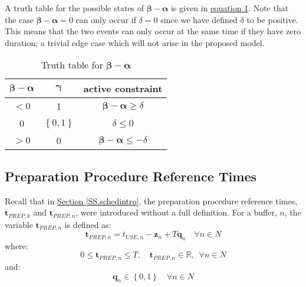 A truth table for the possible states of 
$\boldsymbol{\beta} - \boldsymbol{\alpha}$ is given in
\hyperref[tbl.truthalphabeta]{equation \ref*{tbl.truthalphabeta}}.
Note that the case $\boldsymbol{\beta} - \boldsymbol{\alpha} = 0$ can only
occur if $\delta = 0$ since we have defined $\delta$ to be positive.
This means that the two events can only occur at the same time if they have
zero duration; a trivial edge case which will not arise in the proposed model.
\begin{table}[h!]
    \centering
    \caption{Truth table for $\boldsymbol{\beta} - \boldsymbol{\alpha}$}
    \label{tbl.truthalphabeta}
    \begin{tabular}{c c | c}
        $\boldsymbol{\beta} - \boldsymbol{\alpha}$ & $\boldsymbol{\gamma}$ &
        active constraint\\ \hline
        $< 0$ & 1 & $\boldsymbol{\beta} - \boldsymbol{\alpha} \ge \delta$\\
        0 & $\left\{ 0,1 \right\}$ & $\delta \le 0$\\
        $> 0$ & 0 & $\boldsymbol{\beta} - \boldsymbol{\alpha} \le -\delta$\\
    \end{tabular}
\end{table}

\subsection{Preparation Procedure Reference Times}\label{SS.prepreftimes}
Recall that in \hyperref[SS.schedintro]{Section \ref*{SS.schedintro}},
the preparation procedure reference times, 
$\boldsymbol{t}_{\mathit{PREP},k}$ and $\boldsymbol{t}_{\mathit{PREP},n}$, were
introduced without a full definition.
For a buffer, $n$, the variable $\boldsymbol{t}_{\mathit{PREP},n}$ is defined
as:
\begin{equation}
    \boldsymbol{t}_{\mathit{PREP},n} = t_{\mathit{USE},n} - \boldsymbol{z}_{n}
    + T \boldsymbol{q}_{n} \quad \forall n \in N
    \label{eq.tprep}
\end{equation}
where:
\begin{equation}
    0 \le \boldsymbol{t}_{\mathit{PREP},n} \le T, \quad 
    \boldsymbol{t}_{\mathit{PREP},n} \in \mathbb{R}, \enspace \forall n \in N
    \label{eq.tprep1}
\end{equation}
and:
\begin{equation}
    \boldsymbol{q}_{n} \in \left\{0, 1\right\} \quad \forall n \in N
    \label{eq.q}
\end{equation}

